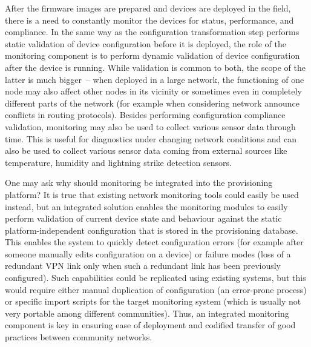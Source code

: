 \documentclass[5p,sort&compress]{elsarticle}
\begin{document}
After the firmware images are prepared and devices are deployed in the field, there is a need to constantly monitor the devices for status, performance, and compliance.
In the same way as the configuration transformation step performs static validation of device configuration before it is deployed, the role of the monitoring component is to perform dynamic validation of device configuration after the device is running.
While validation is common to both, the scope of the latter is much bigger~-- when deployed in a large network, the functioning of one node may also affect other nodes in its vicinity or sometimes even in completely different parts of the network (for example when considering network announce conflicts in routing protocols).
Besides performing configuration compliance validation, monitoring may also be used to collect various sensor data through time.
This is useful for diagnostics under changing network conditions and can also be used to collect various sensor data coming from external sources like temperature, humidity and lightning strike detection sensors.

One may ask why should monitoring be integrated into the provisioning platform?
It is true that existing network monitoring tools could easily be used instead, but an integrated solution enables the monitoring modules to easily perform validation of current device state and behaviour against the static platform-independent configuration that is stored in the provisioning database.
This enables the system to quickly detect configuration errors (for example after someone manually edits configuration on a device) or failure modes (loss of a redundant VPN link only when such a redundant link has been previously configured).
Such capabilities could be replicated using existing systems, but this would require either manual duplication of configuration (an error-prone process) or specific import scripts for the target monitoring system (which is usually not very portable among different communities).
Thus, an integrated monitoring component is key in ensuring ease of deployment and codified transfer of good practices between community networks.

\end{document}
